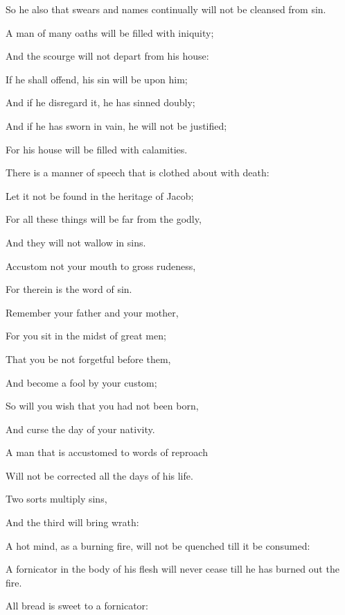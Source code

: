 {\par }{\Q So he also that swears and names
{} continually will not be cleansed from sin.
\par }{\Q {}A man of many oaths will be filled with iniquity;
\par }{\Q And the scourge will not depart from his house:
\par }{\Q If he shall offend, his sin will be upon him;
\par }{\Q And if he disregard it, he has sinned doubly;
\par }{\Q And if he has sworn in vain, he will not be justified;
\par }{\Q For his house will be filled with calamities.
\par }{\Q {}There is a manner of speech that is clothed about with death:
\par }{\Q Let it not be found in the heritage of Jacob;
\par }{\Q For all these things will be far from the godly,
\par }{\Q And they will not wallow in sins.
\par }{\Q {}Accustom not your mouth to gross rudeness,
\par }{\Q For therein is the word of sin.
\par }{\Q {}Remember your father and your mother,
\par }{\Q For you sit in the midst of great men;
\par }{\Q That you be not forgetful before them,
\par }{\Q And become a fool by your custom;
\par }{\Q So will you wish that you had not been born,
\par }{\Q And curse the day of your nativity.
\par }{\Q {}A man that is accustomed to words of reproach
\par }{\Q Will not be corrected all the days of his life.
\par }{\BB \par }{\Q {}Two sorts
{} multiply sins,
\par }{\Q And the third will bring wrath:
\par }{\Q A hot mind, as a burning fire, will not be quenched till it be consumed:
\par }{\Q A fornicator in the body of his flesh will never cease till he has
 burned out the fire.
\par }{\Q {}All bread is sweet to a fornicator:
}
